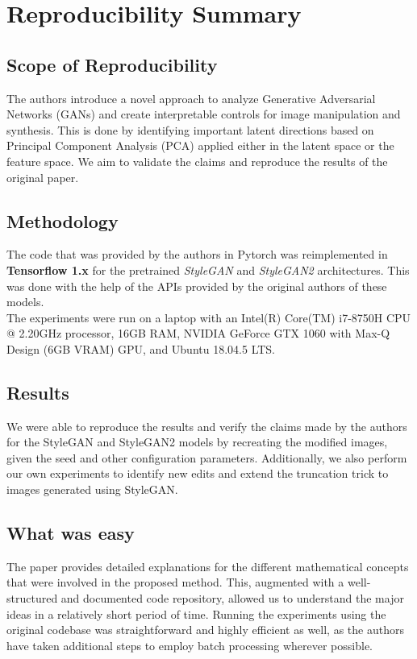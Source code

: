 \section*{Reproducibility Summary}

\subsection*{Scope of Reproducibility}

The authors introduce a novel approach to analyze Generative Adversarial Networks (GANs) and create interpretable controls for image manipulation and synthesis. This is done by identifying important latent directions based on Principal Component Analysis (PCA) applied either in the latent space or the feature space. We aim to validate the claims and reproduce the results of the original paper.

\subsection*{Methodology}

The code that was provided by the authors in Pytorch was reimplemented in \textbf{Tensorflow 1.x} for the pretrained \textit{StyleGAN} and \textit{StyleGAN2} architectures. This was done with the help of the APIs provided by the original authors of these models.
\\
The experiments were run on a laptop with an Intel(R) Core(TM) i7-8750H CPU @ 2.20GHz processor, 16GB RAM, NVIDIA GeForce GTX 1060 with Max-Q Design (6GB VRAM) GPU, and Ubuntu 18.04.5 LTS.

\subsection*{Results}

We were able to reproduce the results and verify the claims made by the authors for the StyleGAN and StyleGAN2 models by recreating the modified images, given the seed and other configuration parameters.
Additionally, we also perform our own experiments to identify new edits and extend the truncation trick to images generated using StyleGAN.

\subsection*{What was easy}

The paper provides detailed explanations for the different mathematical concepts that were involved in the proposed method. This, augmented with a well-structured and documented code repository, allowed us to understand the major ideas in a relatively short period of time. Running the experiments using the original codebase was straightforward and highly efficient as well, as the authors have taken additional steps to employ batch processing wherever possible.

